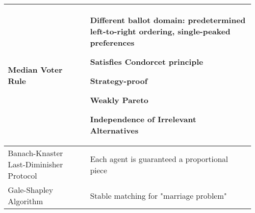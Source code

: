 \documentclass[11pt]{scrartcl}
\begin{document}
\begin{xltabular}{\linewidth}{p{60mm}p{80mm}}
    Median Voter Rule &
    Different ballot domain: predetermined left-to-right ordering, single-peaked preferences
    
    Satisfies Condorcet principle
    
    Strategy-proof 
    
    Weakly Pareto
    
    Independence of Irrelevant Alternatives\\ \hline

    Banach-Knaster Last-Diminisher Protocol &

    Each agent is guaranteed a proportional piece \\ \hline

    Gale-Shapley Algorithm &

    Stable matching for "marriage problem" \\
\end{xltabular}

\newpage
\end{document}
